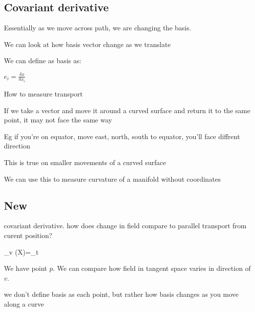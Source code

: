 
\subsection{Covariant derivative}

Essentially as we move across path, we are changing the basis.

We can look at how basis vector change as we translate

We can define as basis as:

\(e_i=\frac{\delta x}{\delta x_i}\)

How to measure transport

If we take a vector and move it around a curved surface and return it to the same point, it may not face the same way

Eg if you're on equator, move east, north, south to equator, you'll face diffrent direction

This is true on smaller movements of a curved surface

We can use this to measure curvature of a manifold without coordinates 

\subsection{New}

covariant derivative. how does change in field compare to parallel transport from curent position?

\nabla_v (X)=\lim_{t}\)

We have point \(p\). We can compare how field in tangent space varies in direction of \(v\).

we don't define basis as each point, but rather how basis changes as you move along a curve

